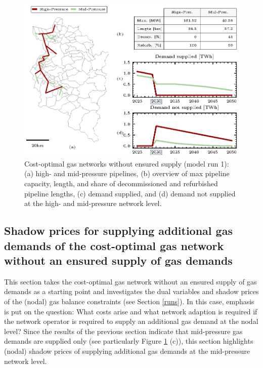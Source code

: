 \begin{figure}[h]
	\centering
	\includegraphics[width=1\linewidth]{figures/modelrun1/overview.eps}
	\caption{Cost-optimal gas networks without ensured supply (model run 1): (a) high- and mid-pressure pipelines, (b) overview of max pipeline capacity, length, and share of decommissioned and refurbished pipeline lengths, (c) demand supplied, and (d) demand not supplied at the high- and mid-pressure network level.}
	\label{fig:1}
\end{figure}

\subsection{Shadow prices for supplying additional gas demands of the cost-optimal gas network without an ensured supply of gas demands}\label{modelrun2}
This section takes the cost-optimal gas network without an ensured supply of gas demands as a starting point and investigates the dual variables and shadow prices of the (nodal) gas balance constraints (see Section \ref{runs}). In this case, emphasis is put on the question: What costs arise and what network adaption is required if the network operator is required to supply an additional gas demand at the nodal level? Since the results of the previous section indicate that mid-pressure gas demands are supplied only (see particularly Figure \ref{fig:1} (c)), this section highlights (nodal) shadow prices of supplying additional gas demands at the mid-pressure network level. \vspace{0.3cm} 



